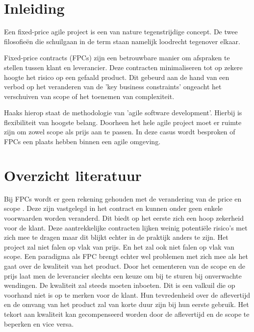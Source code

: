 \documentclass{hogent-article}
\affiliation{
    \textsuperscript{1} \href{mailto:indy.vancanegem@student.hogent.be}{indy.vancanegem@student.hogent.be}}
\affiliation{
    \textsuperscript{2} \href{mailto:mout.pessemier@student.hogent.be}{mout.pessemier@student.hogent.be}}
\affiliation{
    \textsuperscript{3} \href{mailto:nante.vermeulen@student.hogent.be}{nante.vermeulen@student.hogent.be}}
\affiliation{
    \textsuperscript{4} \href{mailto:jef.malfliet@student.hogent.be}{jef.malfliet@student.hogent.be}
}
\begin{document}
	
    \flushbottom
    \maketitle
    \tableofcontents 
    \thispagestyle{empty} %
	
	\section{Inleiding}
	 Een fixed-price agile project is een van nature tegenstrijdige concept. De twee filosofieën die schuilgaan in de term staan namelijk loodrecht tegenover elkaar.
     
     Fixed-price contracts (FPCs) zijn een betrouwbare manier om afspraken te stellen tussen klant en leverancier. Deze contracten minimaliseren tot op zekere hoogte het risico op een gefaald product. Dit gebeurd aan de hand van een verbod op het veranderen van de 'key business constraints' ongeacht het verschuiven van scope of het toenemen van complexiteit.
     
     Haaks hierop staat de methodologie van 'agile software development'. Hierbij is flexibiliteit van hoogste belang. Doorheen het hele agile project moet er ruimte zijn om zowel scope als prijs aan te passen. In deze casus wordt besproken of FPCs een plaats hebben binnen een agile omgeving.
	
	\section{Overzicht literatuur}
	
    
	Bij FPCs wordt er geen rekening gehouden met de verandering van de price en scope \autocite{SCRUM2012}. Deze zijn vastgelegd in het contract en kunnen onder geen enkele voorwaarden worden veranderd. Dit biedt op het eerste zich een hoop zekerheid voor de klant. Deze aantrekkelijke contracten lijken weinig potentiële risico's met zich mee te dragen maar dit blijkt echter in de praktijk anders te zijn. Het project zal niet falen op vlak van prijs. En het zal ook niet falen op vlak van scope. Een paradigma als FPC brengt echter wel problemen met zich mee als het gaat over de kwaliteit van het product. Door het cementeren van de scope en de prijs laat men de leverancier slechts een keuze om bij te sturen bij onverwachte wendingen. De kwaliteit zal steeds moeten inboeten. Dit is een valkuil die op voorhand niet is op te merken voor de klant. Hun tevredenheid over de aflevertijd en de omvang van het product zal van korte duur zijn bij hun eerste gebruik. Het tekort aan kwaliteit kan gecompenseerd worden door de aflevertijd en de scope te beperken en vice versa.
    
\end{document}
